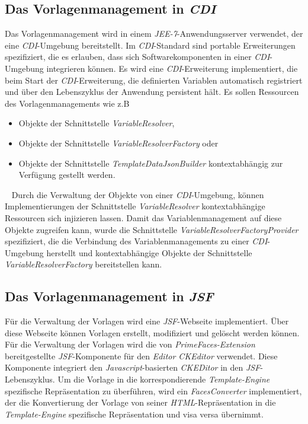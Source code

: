 \subsection{Das Vorlagenmanagement in \emph{CDI}}
\label{sec:sub-template-management-cdi}
Das Vorlagenmanagement wird in einem \emph{JEE-7}-Anwendungsserver verwendet, der eine \emph{CDI}-Umgebung bereitstellt. Im \emph{CDI}-Standard sind portable Erweiterungen  spezifiziert, die es erlauben, dass sich Softwarekomponenten in einer \emph{CDI}-Umgebung integrieren können. Es wird eine \emph{CDI}-Erweiterung implementiert, die beim Start der \emph{CDI}-Erweiterung, die definierten Variablen automatisch registriert und über den Lebenszyklus der Anwendung persistent hält. Es sollen Ressourcen des Vorlagenmanagements wie z.B
\begin{itemize}
	\item Objekte der Schnittstelle \emph{VariableResolver},
	\item Objekte der Schnittstelle \emph{VariableResolverFactory} oder
	\item Objekte der Schnittstelle \emph{TemplateDataJsonBuilder} kontextabhängig zur Verfügung gestellt werden.
\end{itemize}
\ \newline
Durch die Verwaltung der Objekte von einer \emph{CDI}-Umgebung, können Implementierungen der Schnittstelle \emph{VariableResolver} kontextabhängige Ressourcen sich injizieren lassen. Damit das Variablenmanagement auf diese Objekte zugreifen kann, wurde die Schnittstelle \emph{VariableResolverFactoryProvider} spezifiziert, die die Verbindung des Variablenmanagements zu einer \emph{CDI}-Umgebung herstellt und kontextabhängige Objekte der Schnittstelle \emph{VariableResolverFactory} bereitstellen kann.

\subsection{Das Vorlagenmanagement in \emph{JSF}}
\label{sec-sub-specification-jsf}
Für die Verwaltung der Vorlagen wird eine \emph{JSF}-Webseite implementiert. Über diese Webseite können Vorlagen erstellt, modifiziert und gelöscht werden können. Für die Verwaltung der Vorlagen wird die von \emph{PrimeFaces-Extension} bereitgestellte \emph{JSF}-Komponente für den \emph{Editor CKEditor} verwendet. Diese Komponente integriert den \emph{Javascript}-basierten \emph{CKEDitor} in den \emph{JSF}-Lebenszyklus. Um die Vorlage in die korrespondierende \emph{Template-Engine} spezifische Repräsentation zu überführen, wird ein \emph{FacesConverter} implementiert, der die Konvertierung der Vorlage von seiner \emph{HTML}-Repräsentation in die \emph{Template-Engine} spezifische Repräsentation und visa versa übernimmt.

